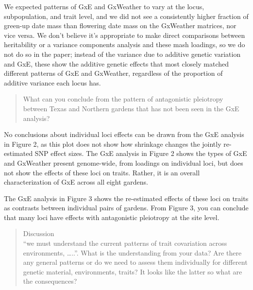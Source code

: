 \documentclass[
  letterpaper,
  DIV=11,
  numbers=noendperiod]{scrartcl}
\begin{document}
We expected patterns of GxE and GxWeather to vary at the locus,
subpopulation, and trait level, and we did not see a consistently higher
fraction of green-up date mass than flowering date mass on the GxWeather
matrices, nor vice versa. We don't believe it's appropriate to make
direct comparisons between heritability or a variance components
analysis and these mash loadings, so we do not do so in the paper;
instead of the variance due to additive genetic variation and GxE, these
show the additive genetic effects that most closely matched different
patterns of GxE and GxWeather, regardless of the proportion of additive
variance each locus has.

\begin{quote}
\begin{tcolorbox}[enhanced jigsaw, rightrule=.15mm, colframe=quarto-callout-warning-color-frame, leftrule=.75mm, arc=.35mm, colback=white, opacityback=0, left=2mm, breakable, toprule=.15mm, bottomrule=.15mm]

What can you conclude from the pattern of antagonistic pleiotropy
between Texas and Northern gardens that has not been seen in the GxE
analysis?

\end{tcolorbox}
\end{quote}

No conclusions about individual loci effects can be drawn from the GxE
analysis in Figure 2, as this plot does not show how shrinkage changes
the jointly re-estimated SNP effect sizes. The GxE analysis in Figure 2
shows the types of GxE and GxWeather present genome-wide, from loadings
on individual loci, but does not show the effects of these loci on
traits. Rather, it is an overall characterization of GxE across all
eight gardens.

The GxE analysis in Figure 3 shows the re-estimated effects of these
loci on traits as contrasts between individual pairs of gardens. From
Figure 3, you can conclude that many loci have effects with antagonistic
pleiotropy at the site level.

\begin{quote}
\begin{tcolorbox}[enhanced jigsaw, rightrule=.15mm, colframe=quarto-callout-warning-color-frame, leftrule=.75mm, arc=.35mm, colback=white, opacityback=0, left=2mm, breakable, toprule=.15mm, bottomrule=.15mm]

Discussion\\
``we must understand the current patterns of trait covariation across
environments, \ldots..''. What is the understanding from your data? Are
there any general patterns or do we need to assess them individually for
different genetic material, environments, traits? It looks like the
latter so what are the consequences?

\end{tcolorbox}
\end{quote}
\end{document}
